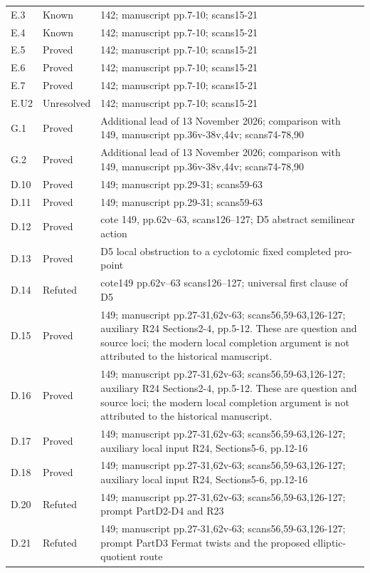{\begin{longtable}{p{1.9cm}p{1.7cm}p{10.3cm}}
E.3 & Known & 142; manuscript pp.7-10; scans15-21 \\
E.4 & Known & 142; manuscript pp.7-10; scans15-21 \\
E.5 & Proved & 142; manuscript pp.7-10; scans15-21 \\
E.6 & Proved & 142; manuscript pp.7-10; scans15-21 \\
E.7 & Proved & 142; manuscript pp.7-10; scans15-21 \\
E.U2 & Unresolved & 142; manuscript pp.7-10; scans15-21 \\
G.1 & Proved & Additional lead of 13 November 2026; comparison with 149, manuscript pp.36v-38v,44v; scans74-78,90 \\
G.2 & Proved & Additional lead of 13 November 2026; comparison with 149, manuscript pp.36v-38v,44v; scans74-78,90 \\
D.10 & Proved & 149; manuscript pp.29-31; scans59-63 \\
D.11 & Proved & 149; manuscript pp.29-31; scans59-63 \\
D.12 & Proved & cote 149, pp.62v--63, scans126--127; D5 abstract semilinear action \\
D.13 & Proved & D5 local obstruction to a cyclotomic fixed completed pro-point \\
D.14 & Refuted & cote149 pp.62v--63 scans126--127; universal first clause of D5 \\
D.15 & Proved & 149; manuscript pp.27-31,62v-63; scans56,59-63,126-127; auxiliary R24 Sections2-4, pp.5-12. These are question and source loci; the modern local completion argument is not attributed to the historical manuscript. \\
D.16 & Proved & 149; manuscript pp.27-31,62v-63; scans56,59-63,126-127; auxiliary R24 Sections2-4, pp.5-12. These are question and source loci; the modern local completion argument is not attributed to the historical manuscript. \\
D.17 & Proved & 149; manuscript pp.27-31,62v-63; scans56,59-63,126-127; auxiliary local input R24, Sections5-6, pp.12-16 \\
D.18 & Proved & 149; manuscript pp.27-31,62v-63; scans56,59-63,126-127; auxiliary local input R24, Sections5-6, pp.12-16 \\
D.20 & Refuted & 149; manuscript pp.27-31,62v-63; scans56,59-63,126-127; prompt PartD2-D4 and R23 \\
D.21 & Refuted & 149; manuscript pp.27-31,62v-63; scans56,59-63,126-127; prompt PartD3 Fermat twists and the proposed elliptic-quotient route \\

\end{longtable}}
